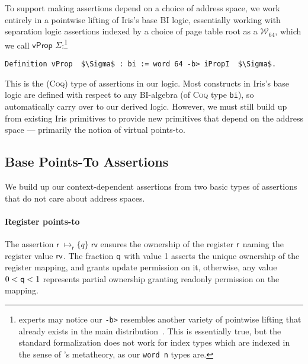 To support making assertions depend on a choice of address space, we work entirely in a pointwise lifting of Iris's base BI logic,
essentially working with separation logic assertions indexed by a choice of page table root as a $\mathcal{W}_{64}$, which we call $\textsf{vProp }\Sigma$:\footnote{
  \iris experts may notice our \lstinline|-b>| resembles another variety of pointwise lifting that already exists in the main \iris
  distribution~\cite{dang2019rustbelt,dang2022compass}. This is essentially true, but the standard formalization does not work for index types which
  are indexed in the sense of \coq's metatheory, as our \lstinline|word n| types are.
}
\begin{lstlisting}[language=Coq]
  Definition vProp  $\Sigma$ : bi := word 64 -b> iPropI  $\Sigma$.
\end{lstlisting}
This is the (\textsc{Coq}) type of assertions in our logic.
Most constructs in Iris's base logic are defined with respect to any BI-algebra (of \textsc{Coq} type \lstinline|bi|), so automatically
carry over to our derived logic.
However, we must still build up from existing Iris primitives to provide new primitives that depend on the address space --- primarily the notion
of virtual points-to.


\subsection{Base Points-To Assertions}
\label{sec:pointsto}
We build up our context-dependent assertions from two basic types of assertions that do not care about address spaces.

\paragraph{Register points-to} 
The assertion $\textsf{r}\;\mapsto_{\textsf{r}}\{q\}\;\textsf{rv}$ ensures the ownership of the register $\mathsf{r}$ naming the register value $\mathsf{rv}$. 
The fraction $\mathsf{q}$ with value 1 asserts the unique ownership of the register mapping, and grants update permission on it, 
otherwise, any value $0 < \mathsf{q} <1$ represents partial ownership granting readonly permission on the mapping.

